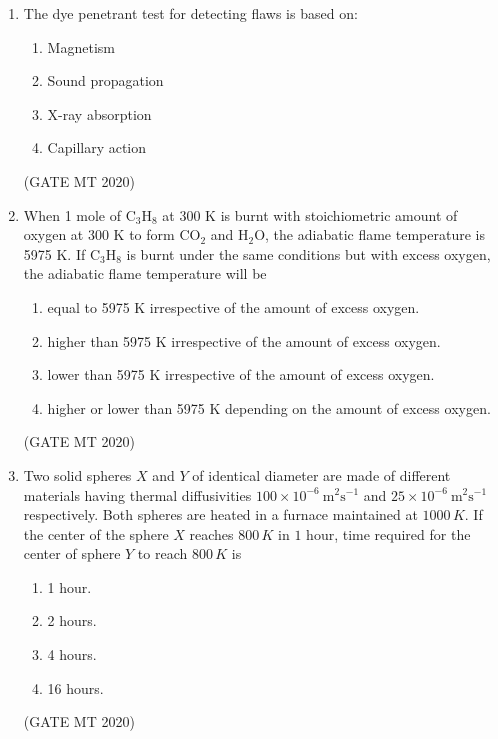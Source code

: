 \documentclass[journal, 11pt, onecolumn]{IEEEtran}
\theoremstyle{remark}
\begin{document}
\begin{enumerate}
\item The dye penetrant test for detecting flaws is based on:  

\begin{multicols}{2}
\begin{enumerate}
\item Magnetism  
\item Sound propagation  
\item X-ray absorption  
\item Capillary action  
\end{enumerate}
\end{multicols}
\hfill(GATE MT 2020)

\item When 1 mole of C$_3$H$_8$ at 300 K is burnt with stoichiometric amount of oxygen at 300 K to form CO$_2$ and H$_2$O, the adiabatic flame temperature is 5975 K. If C$_3$H$_8$ is burnt under the same conditions but with excess oxygen, the adiabatic flame temperature will be  

\begin{multicols}{2}
\begin{enumerate}
\item equal to 5975 K irrespective of the amount of excess oxygen.  
\item higher than 5975 K irrespective of the amount of excess oxygen.  
\item lower than 5975 K irrespective of the amount of excess oxygen.  
\item higher or lower than 5975 K depending on the amount of excess oxygen.  
\end{enumerate}
\end{multicols}
\hfill(GATE MT 2020)

\item Two solid spheres $X$ and $Y$ of identical diameter are made of different materials having thermal diffusivities 
$100 \times 10^{-6} \ \text{m}^2\text{s}^{-1}$ and $25 \times 10^{-6} \ \text{m}^2\text{s}^{-1}$ respectively. Both spheres are heated in a furnace maintained at $1000 \, K$. If the center of the sphere $X$ reaches $800 \, K$ in $1$ hour, time required for the center of sphere $Y$ to reach $800 \, K$ is
\begin{enumerate}
\item 1 hour.  
\item 2 hours.  
\item 4 hours.  
\item 16 hours.  
\end{enumerate}
\hfill(GATE MT 2020)



\end{enumerate}
\end{document}
